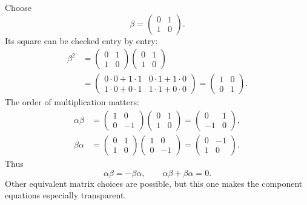 Choose
\begin{equation}
\beta=
\begin{pmatrix}
0&1\\
1&0
\end{pmatrix}.
\end{equation}
Its square can be checked entry by entry:
\begin{equation}
\begin{aligned}
\beta^2
&=
\begin{pmatrix}
0&1\\
1&0
\end{pmatrix}
\begin{pmatrix}
0&1\\
1&0
\end{pmatrix}\\
&=
\begin{pmatrix}
0\cdot0+1\cdot1&0\cdot1+1\cdot0\\
1\cdot0+0\cdot1&1\cdot1+0\cdot0
\end{pmatrix}
=
\begin{pmatrix}
1&0\\
0&1
\end{pmatrix}.
\end{aligned}
\end{equation}
The order of multiplication matters:
\begin{align}
\alpha\beta
&=
\begin{pmatrix}
1&0\\
0&-1
\end{pmatrix}
\begin{pmatrix}
0&1\\
1&0
\end{pmatrix}
=
\begin{pmatrix}
0&1\\
-1&0
\end{pmatrix},\\
\beta\alpha
&=
\begin{pmatrix}
0&1\\
1&0
\end{pmatrix}
\begin{pmatrix}
1&0\\
0&-1
\end{pmatrix}
=
\begin{pmatrix}
0&-1\\
1&0
\end{pmatrix}.
\end{align}
Thus
\begin{equation}
\alpha\beta=-\beta\alpha,
\qquad
\alpha\beta+\beta\alpha=0.
\end{equation}
Other equivalent matrix choices are possible, but this one makes the component equations especially transparent.

